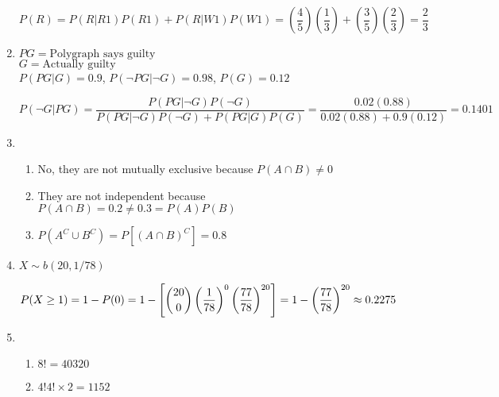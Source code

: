 \documentclass{article}
\newcommand\mfrac[2]{\left(\dfrac{#1}{#2}\right)}
\begin{document}
\begin{enumerate}
      $P(R) = P(R|R1)P(R1) + P(R|W1)P(W1) = \mfrac{4}{5}\mfrac{1}{3} + \mfrac{3}{5}\mfrac{2}{3}
	= \dfrac{2}{3}$
     
     \item
      $PG = \text{Polygraph says guilty}$\\
      $G = \text{Actually guilty}$\\
      
      $P(PG|G) = 0.9$, $P(\neg PG | \neg G) = 0.98$, $P(G) = 0.12$
      
      $P(\neg G | PG) = \dfrac{P(PG | \neg G) P(\neg G)}{P(PG|\neg G)P(\neg G) + P(PG | G)P(G)}
	= \dfrac{0.02(0.88)}{0.02(0.88) + 0.9(0.12)} = 0.1401$
     
     \item
      \begin{enumerate}
       \item
	No, they are not mutually exclusive because $P(A \cap B) \ne 0$
       
       \item
	They are not independent because $P(A \cap B) = 0.2 \ne 0.3 = P(A)P(B)$
       
       \item
	$P(A^C \cup B^C) = P[(A \cap B)^C] = 0.8$
      \end{enumerate}
     
     \item
      $X \sim b(20, 1/78)$
      
      $P(X \ge 1) = 1 - P(0) = 1 - \left[\dbinom{20}{0}\mfrac{1}{78}^0\mfrac{77}{78}^{20}\right]
	= 1 - \mfrac{77}{78}^{20} \approx 0.2275$
     
     \item
      \begin{enumerate}
       \item
	$8! = 40320$
       
       \item
	$4!4!\times 2 = 1152$
      \end{enumerate}
    \end{enumerate}
\end{document}
